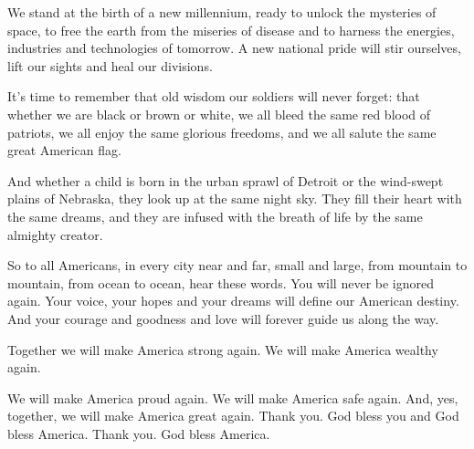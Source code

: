 \documentclass[10pt,a4paper]{article}
\begin{document}
We stand at the birth of a new millennium, ready to unlock the mysteries of space, to free the earth from the miseries of disease and to harness the energies, industries and technologies of tomorrow. A new national pride will stir ourselves, lift our sights and heal our divisions.

It's time to remember that old wisdom our soldiers will never forget: that whether we are black or brown or white, we all bleed the same red blood of patriots, we all enjoy the same glorious freedoms, and we all salute the same great American flag.

And whether a child is born in the urban sprawl of Detroit or the wind-swept plains of Nebraska, they look up at the same night sky. They fill their heart with the same dreams, and they are infused with the breath of life by the same almighty creator.

So to all Americans, in every city near and far, small and large, from mountain to mountain, from ocean to ocean, hear these words. You will never be ignored again. Your voice, your hopes and your dreams will define our American destiny. And your courage and goodness and love will forever guide us along the way.

Together we will make America strong again. We will make America wealthy again.

We will make America proud again. We will make America safe again. And, yes, together, we will make America great again. Thank you. God bless you and God bless America. Thank you. God bless America.
\end{document}
